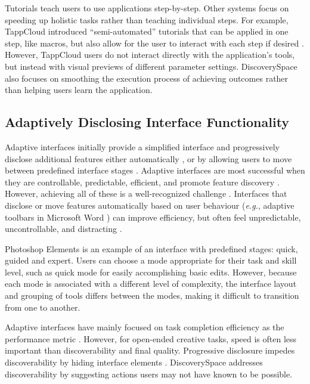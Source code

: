 Tutorials teach users to use applications step-by-step. Other systems focus on speeding up holistic tasks rather than teaching individual steps. For example, TappCloud introduced ``semi-automated'' tutorials that can be applied in one step, like macros, but also allow for the user to interact with each step if desired \cite{Laput2012}. However, TappCloud users do not interact directly with the application's tools, but instead with visual previews of different parameter settings. Discovery\-Space also focuses on smoothing the execution process of achieving outcomes rather than helping users learn the application.

\subsection{Adaptively Disclosing Interface Functionality}
Adaptive interfaces initially provide a simplified interface and progressively disclose additional features either automatically \cite{Gajos2006, McGrenere2002, Paymans2004}, or by allowing users to move between predefined interface stages \cite{Carroll1984, Leung2010, McGrenere2002, Shneiderman2000}. Adaptive interfaces are most successful when they are controllable, predictable, efficient, and promote feature discovery \cite{MM-gi2000, Shneiderman2002a}. However, achieving all of these is a well-recognized challenge \cite{Findlater2010, McGrenere2002}. Interfaces that disclose or move features automatically based on user behaviour (\textit{e.g.}, adaptive toolbars in Microsoft Word \cite{Gajos2006}) can improve efficiency, but often feel unpredictable, uncontrollable, and distracting \cite{Gajos2006, Paymans2004, Shneiderman2002a}.

Photoshop Elements is an example of an interface with predefined stages: quick, guided and expert. Users can choose a mode appropriate for their task and skill level, such as quick mode for easily accomplishing basic edits. However, because each mode is associated with a different level of complexity, the interface layout and grouping of tools differs between the modes, making it difficult to transition from one to another.

Adaptive interfaces have mainly focused on task completion efficiency as the performance metric \cite{Gajos2006, Leung2010}. However, for open-ended creative tasks, speed is often less important than discoverability and final quality. Progressive disclosure impedes discoverability by hiding interface elements \cite{Findlater2010}. Discovery\-Space addresses discoverability by suggesting actions users may not have known to be possible.

